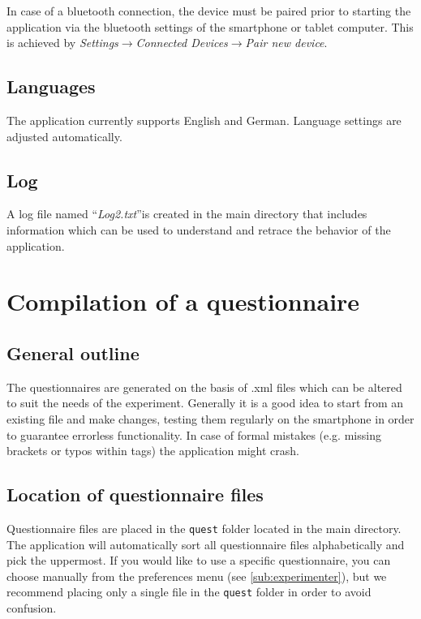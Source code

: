 \documentclass[11pt,a4paper,titlepage]{article}
\begin{document}
In case of a bluetooth connection, the device must be paired prior to starting the application via the bluetooth settings of the smartphone or tablet computer. This is achieved by \textit{Settings}$\rightarrow$\textit{Connected Devices}$\rightarrow$\textit{Pair new device}.


\subsection{Languages}

The application currently supports English and German. Language settings are adjusted automatically.


\subsection{Log}


A log file named ``\textit{Log2.txt}''is created in the main directory that includes information which can be used to understand and retrace the behavior of the application. 


\section{Compilation of a questionnaire}


\subsection{General outline}

The questionnaires are generated on the basis of .xml files which can be altered to suit the needs of the experiment. Generally it is a good idea to start from an existing file and make changes, testing them regularly on the smartphone in order to guarantee errorless functionality. In case of formal mistakes (e.g. missing brackets or typos within tags) the application might crash. 


\subsection{Location of questionnaire files}

Questionnaire files are placed in the \texttt{quest} folder located in the main directory. The application will automatically sort all questionnaire files alphabetically and pick the uppermost. If you would like to use a specific questionnaire, you can choose manually from the preferences menu (see \ref{sub:experimenter}), but we recommend placing only a single file in the \texttt{quest} folder in order to avoid confusion. 
\end{document}
